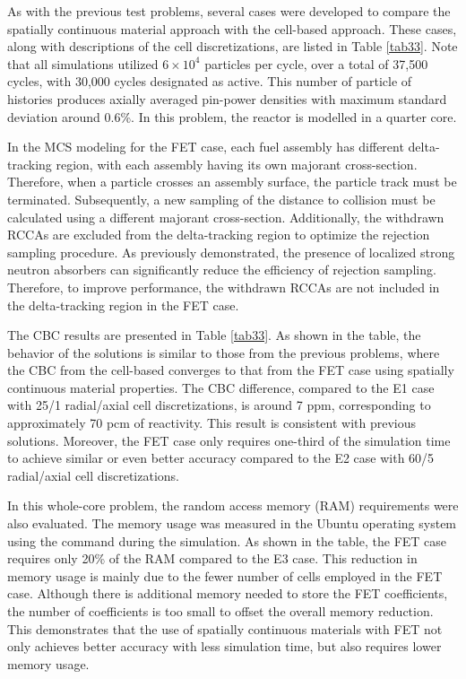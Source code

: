 As with the previous test problems, several cases were developed to compare the spatially continuous material approach with the cell-based approach. These cases, along with descriptions of the cell discretizations, are listed in Table \ref{tab33}. Note that all simulations utilized \(6 \times 10^4\) particles per cycle, over a total of 37,500 cycles, with 30,000 cycles designated as active. This number of particle of histories produces axially averaged pin-power densities with maximum standard deviation around 0.6\%. In this problem, the reactor is modelled in a quarter core.

In the MCS modeling for the FET case, each fuel assembly has different delta-tracking region, with each assembly having its own majorant cross-section. Therefore, when a particle crosses an assembly surface, the particle track must be terminated. Subsequently, a new sampling of the distance to collision must be calculated using a different majorant cross-section. Additionally, the withdrawn RCCAs are excluded from the delta-tracking region to optimize the rejection sampling procedure. As previously demonstrated, the presence of localized strong neutron absorbers can significantly reduce the efficiency of rejection sampling. Therefore, to improve performance, the withdrawn RCCAs are not included in the delta-tracking region in the FET case.

The CBC results are presented in Table \ref{tab33}. As shown in the table, the behavior of the solutions is similar to those from the previous problems, where the CBC from the cell-based converges to that from the FET case using spatially continuous material properties. The CBC difference, compared to the E1 case with 25/1 radial/axial cell discretizations, is around 7 ppm, corresponding to approximately 70 pcm of reactivity. This result is consistent with previous solutions. Moreover, the FET case only requires one-third of the simulation time to achieve similar or even better accuracy compared to the E2 case with 60/5 radial/axial cell discretizations.

In this whole-core problem, the random access memory (RAM) requirements were also evaluated. The memory usage was measured in the Ubuntu operating system using the  command during the simulation. As shown in the table, the FET case requires only 20\% of the RAM compared to the E3 case. This reduction in memory usage is mainly due to the fewer number of cells employed in the FET case. Although there is additional memory needed to store the FET coefficients, the number of coefficients is too small to offset the overall memory reduction. This demonstrates that the use of spatially continuous materials with FET not only achieves better accuracy with less simulation time, but also requires lower memory usage.

